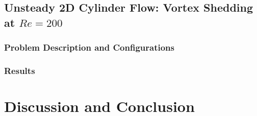 \documentclass[font=STIX2]{gw-dissertation}[2021/11/19]
\begin{document}
    \section{Unsteady 2D Cylinder Flow: Vortex Shedding at \texorpdfstring{$Re=200$}{re200}}
    \label{sec:pinn-2d-cylinder-re200}

        \subsection{Problem Description and Configurations}
        \label{sec:pinn-2d-cylinder-re200-conf}
        

        \subsection{Results}
        \label{sec:pinn-2d-cylinder-re200-results}
        

\chapter{Discussion and Conclusion}\label{chap:discussion}


\sloppy
\printbibliography[heading=bibintoc, title=References]
\fussy
\end{document}
